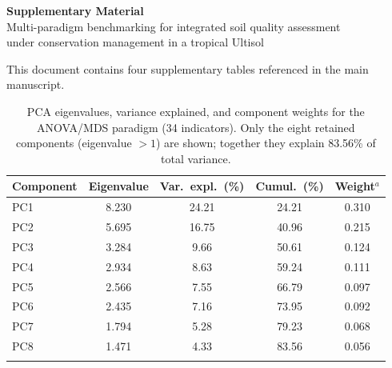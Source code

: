 \documentclass[12pt]{article}
\begin{document}
\begin{center}
{\Large\bfseries Supplementary Material}\\[6pt]
{\large Multi-paradigm benchmarking for integrated soil quality assessment\\
under conservation management in a tropical Ultisol}\\[12pt]
\end{center}

\noindent This document contains four supplementary tables referenced in the main manuscript.

\clearpage
\begin{table}[ht]
\centering
\caption{PCA eigenvalues, variance explained, and component weights for the ANOVA/MDS paradigm (34 indicators). Only the eight retained components (eigenvalue $> 1$) are shown; together they explain 83.56\% of total variance.}\label{tab:s1_eigen}
\begin{tabular}{lcccc}
\toprule
Component & Eigenvalue & Var.\ expl.\ (\%) & Cumul.\ (\%) & Weight$^a$ \\
\midrule
PC1  & 8.230 & 24.21 & 24.21 & 0.310 \\
PC2  & 5.695 & 16.75 & 40.96 & 0.215 \\
PC3  & 3.284 & 9.66  & 50.61 & 0.124 \\
PC4  & 2.934 & 8.63  & 59.24 & 0.111 \\
PC5  & 2.566 & 7.55  & 66.79 & 0.097 \\
PC6  & 2.435 & 7.16  & 73.95 & 0.092 \\
PC7  & 1.794 & 5.28  & 79.23 & 0.068 \\
PC8  & 1.471 & 4.33  & 83.56 & 0.056 \\
\botrule
\end{tabular}
\smallskip

\end{table}
\end{document}
